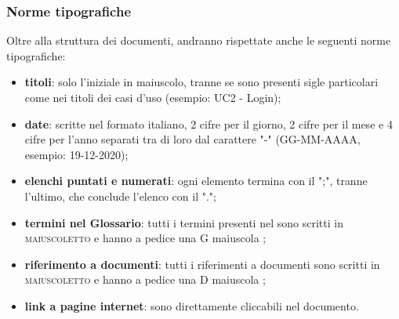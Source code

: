 	\subsubsection{Norme tipografiche}
	Oltre alla struttura dei documenti, andranno rispettate anche le seguenti norme tipografiche:
	\begin{itemize}
		\item \textbf{titoli}: solo l'iniziale in maiuscolo, tranne se sono presenti sigle particolari come nei titoli dei casi d'uso (esempio: UC2 - Login);
		\item \textbf{date}: scritte nel formato italiano, 2 cifre per il giorno, 2 cifre per il mese e 4 cifre per l'anno separati tra di loro dal carattere "-" (GG-MM-AAAA, esempio: 19-12-2020);
		\item \textbf{elenchi puntati e numerati}: ogni elemento termina con il ";", tranne l'ultimo, che conclude l'elenco con il ".";
		\item \textbf{termini nel Glossario}: tutti i termini presenti nel  sono scritti in \textsc{maiuscoletto} e hanno a pedice una G maiuscola \glock{};
		\item \textbf{riferimento a documenti}: tutti i riferimenti a documenti sono scritti in \textsc{maiuscoletto} e hanno a pedice una D maiuscola \dext{};
		\item \textbf{link a pagine internet}: sono direttamente cliccabili nel documento.
	\end{itemize}

